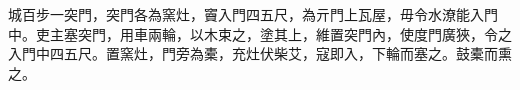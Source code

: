 
\begin{pinyinscope}
城百步一突門，突門各為窯灶，竇入門四五尺，為亓門上瓦屋，毋令水潦能入門中。吏主塞突門，用車兩輪，以木束之，塗其上，維置突門內，使度門廣狹，令之入門中四五尺。置窯灶，門旁為橐，充灶伏柴艾，寇即入，下輪而塞之。鼓橐而熏之。


\end{pinyinscope}
